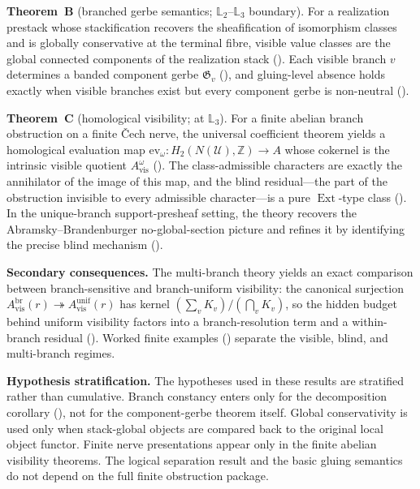 \medskip
\noindent\textbf{Theorem~B} (branched gerbe semantics; $\mathbb{L}_2$--$\mathbb{L}_3$ boundary).
For a realization prestack whose stackification recovers the sheafification of isomorphism classes and is globally conservative at the terminal fibre, visible value classes are the global connected components of the realization stack (). Each visible branch $v$ determines a banded component gerbe $\mathfrak{G}_v$ (), and gluing-level absence holds exactly when visible branches exist but every component gerbe is non-neutral ().

\medskip
\noindent\textbf{Theorem~C} (homological visibility; at $\mathbb{L}_3$).
For a finite abelian branch obstruction on a finite \v{C}ech nerve, the universal coefficient theorem yields a homological evaluation map $\mathrm{ev}_\omega : H_2(N(\mathcal{U}),\mathbb{Z}) \to A$ whose cokernel is the intrinsic visible quotient $A_{\mathrm{vis}}^\omega$ (). The class-admissible characters are exactly the annihilator of the image of this map, and the blind residual---the part of the obstruction invisible to every admissible character---is a pure $\operatorname{Ext}$-type class (). In the unique-branch support-presheaf setting, the theory recovers the Abramsky--Brandenburger no-global-section picture and refines it by identifying the precise blind mechanism ().

\medskip
\noindent\textbf{Secondary consequences.}
The multi-branch theory yields an exact comparison between branch-sensitive and branch-uniform visibility: the canonical surjection $A_{\mathrm{vis}}^{\mathrm{br}}(r) \twoheadrightarrow A_{\mathrm{vis}}^{\mathrm{unif}}(r)$ has kernel $(\sum_v K_v)/(\bigcap_v K_v)$, so the hidden budget behind uniform visibility factors into a branch-resolution term and a within-branch residual (). Worked finite examples () separate the visible, blind, and multi-branch regimes.

\medskip
\noindent\textbf{Hypothesis stratification.}
The hypotheses used in these results are stratified rather than cumulative. Branch constancy enters only for the decomposition corollary (), not for the component-gerbe theorem itself. Global conservativity is used only when stack-global objects are compared back to the original local object functor. Finite nerve presentations appear only in the finite abelian visibility theorems. The logical separation result and the basic gluing semantics do not depend on the full finite obstruction package.

